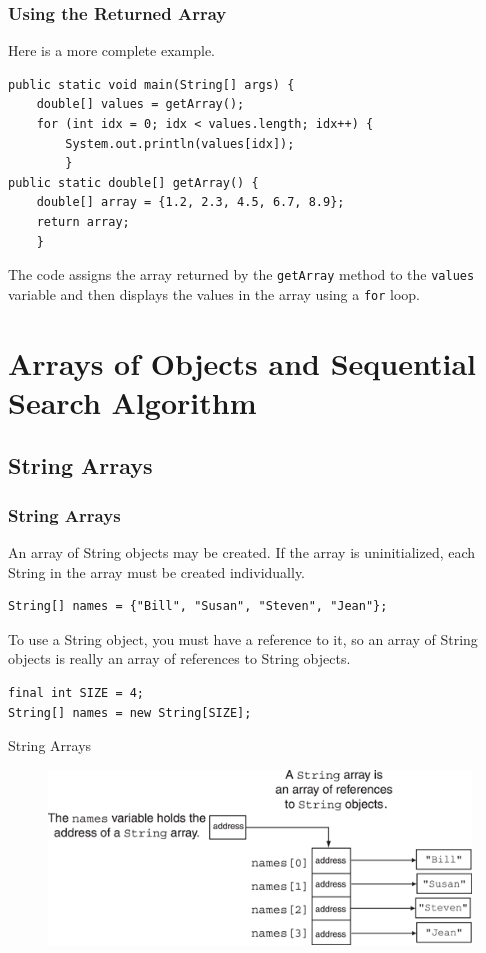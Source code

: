 \documentclass[11pt]{beamer}
\begin{document}
\begin{frame}[fragile]
    \frametitle{Using the Returned Array}
    Here is a more complete example.
    \begin{lstlisting}
public static void main(String[] args) {
    double[] values = getArray();
    for (int idx = 0; idx < values.length; idx++) {
        System.out.println(values[idx]);
        }
public static double[] getArray() {
    double[] array = {1.2, 2.3, 4.5, 6.7, 8.9};
    return array;
    }
    \end{lstlisting}
    The code assigns the array returned by the \texttt{getArray} method to the \texttt{values} variable and then displays the values in the array using a \texttt{for} loop.
\end{frame}

\section{Arrays of Objects and Sequential Search Algorithm}
\subsection{String Arrays}
\begin{frame}[fragile]
    \frametitle{String Arrays}
    An array of String objects may be created. If the array is uninitialized, each String in the array must be created individually.
    \begin{lstlisting}
String[] names = {"Bill", "Susan", "Steven", "Jean"};
    \end{lstlisting}
    To use a String object, you must have a reference to it, so an array of String objects is really an array of references to String objects.
    \begin{lstlisting}
final int SIZE = 4;
String[] names = new String[SIZE];
    \end{lstlisting}
\end{frame}

\begin{frame}
{String Arrays}
    \noindent 
    \begin{figure}[H]
    \centering
    \includegraphics[scale=0.8]{Images/chapter07_section06_fig14.png}
    \end{figure}    
\end{frame}
\end{document}
